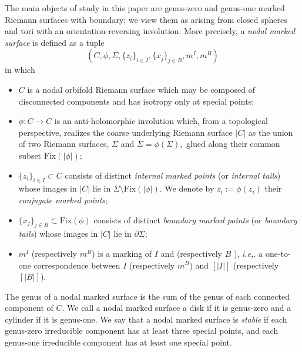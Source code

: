 \documentclass[11pt]{amsart}
\theoremstyle{definition}
\theoremstyle{remark}
\newcommand{\<}{\left<}
\renewcommand{\>}{\right>}
\numberwithin{equation}{section}
\begin{document}
The main objects of study in this paper are genus-zero and genus-one marked Riemann surfaces with boundary; we view them as arising from closed spheres %
and tori with %
an orientation-reversing involution. %
More precisely, a \textit{nodal marked surface} is defined as a %
tuple
$$(C, \phi, \Sigma, \{z_i\}_{i \in I}, \{x_j\}_{j \in B}, m^I, m^B)$$
in %
which
\begin{itemize}
\item  $C$ is a nodal orbifold %
Riemann surface which %
may be composed of %
disconnected components and %
has isotropy only at special points;
\item $\phi: C \to C$ is an anti-holomorphic involution which, from a topological perspective, realizes the coarse underlying Riemann surface $|C|$  as the union of two Riemann surfaces, $\Sigma$ and $\overline{\Sigma}=\phi(\Sigma),$ glued along their common subset $\text{Fix}(|\phi|)$;
\item $\{z_i\}_{i \in I}\subset  C$ consists of distinct \textit{internal marked points} (or \textit{internal tails}) whose images in $|C|$ lie in $\Sigma\setminus\text{Fix}(|\phi|)$. We denote by $\overline{z_i}:= \phi(z_i)$ their \textit{conjugate marked points};
\item $\{x_j\}_{j \in B} \subset \text{Fix}(\phi)$ consists of distinct \textit{boundary marked points} (or \textit{boundary tails}) whose images in $|C|$ lie in ${\partial} \Sigma$;
\item $m^I$ (respectively $m^B$) is a marking of $I$ and (respectively $B$%
), \textit{i.e,.} a %
one-to-one correspondence between  $I$ (respectively $m^B$) and $\left[\lvert I \rvert\right]$ (respectively $[\lvert B \rvert]$).
\end{itemize}
The genus of a nodal marked surface is the sum of the genus of each connected component of $C$. We call a nodal marked surface a disk if it %
is genus-zero and %
a cylinder if it is genus-one.
We say that a nodal marked surface is \textit{stable} if each genus-zero irreducible component has at least three special points, and each genus-one irreducible component has at least one special point.
\end{document}
